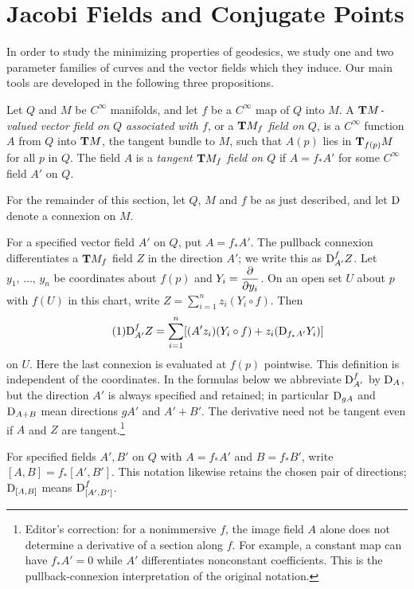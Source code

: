 \documentclass[../main]{subfiles}
\begin{document}
\section{Jacobi Fields and Conjugate Points}\label{ch10:s1}

In order to study the minimizing properties of geodesics, we study one and two parameter families of curves and the vector fields which they induce. Our main tools are developed in the following three propositions.

Let $Q$ and $M$ be $C^\infty$ manifolds, and let $f$ be a $C^\infty$ map of $Q$ into $M$. A \emph{$\tangentbundle{M}$-valued vector field on $Q$ associated with $f$}, or a \emph{$\tangentbundle{M}_f$ field on $Q$}, is a $C^\infty$ function $A$ from $Q$ into $\tangentbundle{M}$, the tangent bundle to $M$, such that $A(p)$ lies in $\tangentspace{M}{f(p)}$ for all $p$ in $Q$. The field $A$ is a \emph{tangent $\tangentbundle{M}_f$ field on $Q$} if $A=f_\ast A'$ for some $C^\infty$ field $A'$ on $Q$.

For the remainder of this section, let $Q$, $M$ and $f$ be as just described, and let $\connection$ denote a connexion on $M$.

For a specified vector field $A'$ on $Q$, put $A=f_*A'$. The pullback connexion differentiates a $\tangentbundle{M}_f$ field $Z$ in the direction $A'$; we write this as $\connection^f_{A'}Z$. Let $y_1,\,\hdots,\,y_n$ be coordinates about $f(p)$ and $Y_i=\pdv{}{y_i}$. On an open set $U$ about $p$ with $f(U)$ in this chart, write $Z=\sum_{i=1}^n z_i(Y_i\circ f)$. Then
    \begin{equation}\tag{1} \label{eqn:ch10.1.1}
    \connection^f_{A'} Z = \sum_{i=1}^n [(A'z_i)(Y_i\circ f) + z_i(\connection_{f_*A'}Y_i)]
    \end{equation}
on $U$. Here the last connexion is evaluated at $f(p)$ pointwise. This definition is independent of the coordinates. In the formulas below we abbreviate $\connection^f_{A'}$ by $\connection_A$, but the direction $A'$ is always specified and retained; in particular $\connection_{gA}$ and $\connection_{A+B}$ mean directions $gA'$ and $A'+B'$. The derivative need not be tangent even if $A$ and $Z$ are tangent.\footnote{Editor's correction: for a nonimmersive $f$, the image field $A$ alone does not determine a derivative of a section along $f$. For example, a constant map can have $f_*A'=0$ while $A'$ differentiates nonconstant coefficients. This is the pullback-connexion interpretation of the original notation.}

For specified fields $A',B'$ on $Q$ with $A=f_*A'$ and $B=f_*B'$, write $[A,B]=f_*[A',B']$. This notation likewise retains the chosen pair of directions; $\connection_{[A,B]}$ means $\connection^f_{[A',B']}$.
\end{document}

